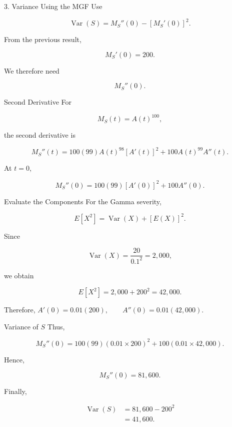 \documentclass[
  ignorenonframetext,
  aspectratio=169,
]{beamer}
\begin{document}
\begin{frame}{3. Variance Using the MGF}
\protect{}\label{variance-using-the-mgf}
Use

\[
\operatorname{Var}(S)
=
M_S''(0)-[M_S'(0)]^2.
\]

From the previous result,

\[
M_S'(0)=200.
\]

We therefore need

\[
M_S''(0).
\]
\end{frame}

\begin{frame}{Second Derivative}
\protect{}\label{second-derivative}
For

\[
M_S(t)=A(t)^{100},
\]

the second derivative is

\[
M_S''(t)
=
100(99)A(t)^{98}[A'(t)]^2
+
100A(t)^{99}A''(t).
\]

At \(t=0\),

\[
M_S''(0)
=
100(99)[A'(0)]^2
+
100A''(0).
\]
\end{frame}

\begin{frame}{Evaluate the Components}
\protect{}\label{evaluate-the-components}
For the Gamma severity,

\[
E[X^2]
=
\operatorname{Var}(X)+[E(X)]^2.
\]

Since

\[
\operatorname{Var}(X)=\frac{20}{0.1^2}=2{,}000,
\]

we obtain

\[
E[X^2]=2{,}000+200^2=42{,}000.
\]

Therefore, \(A'(0)=0.01(200), \qquad A''(0)=0.01(42{,}000).\)
\end{frame}

\begin{frame}{Variance of \(S\)}
\protect{}\label{variance-of-s}
Thus,

\[
M_S''(0)
=
100(99)(0.01\times200)^2
+
100(0.01\times42{,}000).
\]

Hence,

\[
M_S''(0)=81{,}600.
\]

Finally,

\[
\begin{aligned}
\operatorname{Var}(S)
&=81{,}600-200^2\\
&=\boxed{41{,}600}.
\end{aligned}
\]
\end{frame}
\end{document}
